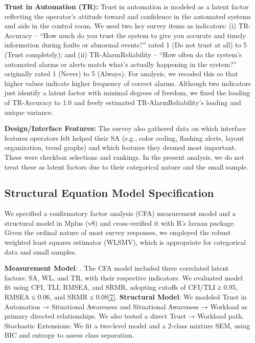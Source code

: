 \documentclass[conference]{IEEEtran}
\begin{document}
\textbf{Trust in Automation (TR):} Trust in automation is modeled as a latent factor reflecting the operator’s attitude toward and confidence in the automated systems and aids in the control room. We used two key survey items as indicators: (i) TR-Accuracy – “How much do you trust the system to give you accurate and timely information during faults or abnormal events?” rated 1 (Do not trust at all) to 5 (Trust completely); and (ii) TR-AlarmReliability – “How often do the system’s automated alarms or alerts match what’s actually happening in the system?” originally rated 1 (Never) to 5 (Always). For analysis, we recoded this so that higher values indicate higher frequency of correct alarms. Although two indicators just identify a latent factor with minimal degrees of freedom, we fixed the loading of TR-Accuracy to 1.0 and freely estimated TR-AlarmReliability’s loading and unique variance.



\textbf{Design/Interface Features:} The survey also gathered data on which interface features operators felt helped their SA (e.g., color coding, flashing alerts, layout organization, trend graphs) and which features they deemed most important. These were checkbox selections and rankings. In the present analysis, we do not treat these as latent factors due to their categorical nature and the small sample.

\subsection{Structural Equation Model Specification}
We specified a confirmatory factor analysis (CFA) measurement model and a structural model in Mplus (v8) and cross-verified it with R’s lavaan package. Given the ordinal nature of most survey responses, we employed the robust weighted least squares estimator (WLSMV), which is appropriate for categorical data and small samples. 

\textbf{Measurement Model}: .
The CFA model included three correlated latent factors: SA, WL, and TR, with their respective indicators. We evaluated model fit using CFI, TLI, RMSEA, and SRMR, adopting cutoffs of CFI/TLI ≥ 0.95, RMSEA ≤ 0.06, and SRMR ≤ 0.08\href{https://www.tandfonline.com/doi/abs/10.1080/10705519909540118}{[7]}. \textbf{Structural Model}: We modeled Trust in Automation → Situational Awareness and Situational Awareness → Workload as primary directed relationships. We also tested a direct Trust → Workload path. Stochastic Extensions: We fit a two-level model and a 2-class mixture SEM, using BIC and entropy to assess class separation.
\end{document}
